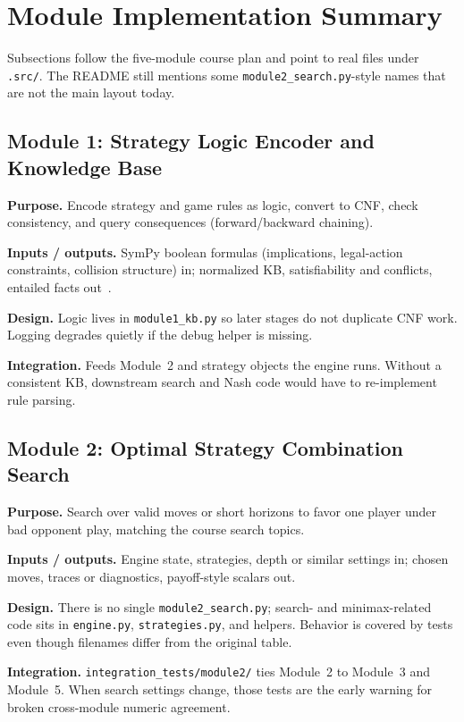 \section{Module Implementation Summary}

Subsections follow the five-module course plan and point to real files under \texttt{.src/}. The README still mentions some \texttt{module2\_search.py}-style names that are not the main layout today.

\subsection{Module 1: Strategy Logic Encoder and Knowledge Base}
\textbf{Purpose.} Encode strategy and game rules as logic, convert to CNF, check consistency, and query consequences (forward/backward chaining).

\textbf{Inputs / outputs.} SymPy boolean formulas (implications, legal-action constraints, collision structure) in; normalized KB, satisfiability and conflicts, entailed facts out~\cite{sympy}.

\textbf{Design.} Logic lives in \texttt{module1\_kb.py} so later stages do not duplicate CNF work. Logging degrades quietly if the debug helper is missing.

\textbf{Integration.} Feeds Module~2 and strategy objects the engine runs. Without a consistent KB, downstream search and Nash code would have to re-implement rule parsing.

\subsection{Module 2: Optimal Strategy Combination Search}
\textbf{Purpose.} Search over valid moves or short horizons to favor one player under bad opponent play, matching the course search topics.

\textbf{Inputs / outputs.} Engine state, strategies, depth or similar settings in; chosen moves, traces or diagnostics, payoff-style scalars out.

\textbf{Design.} There is no single \texttt{module2\_search.py}; search- and minimax-related code sits in \texttt{engine.py}, \texttt{strategies.py}, and helpers. Behavior is covered by tests even though filenames differ from the original table.

\textbf{Integration.} \texttt{integration\_tests/module2/} ties Module~2 to Module~3 and Module~5. When search settings change, those tests are the early warning for broken cross-module numeric agreement.

